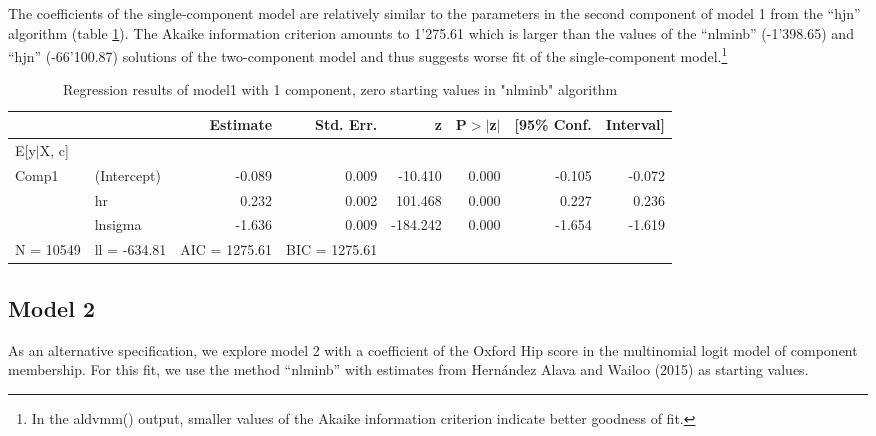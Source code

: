 \documentclass[
]{article}
\begin{document}
The coefficients of the single-component model are relatively similar to the parameters in the second component of model 1 from the ``hjn'' algorithm (table \ref{tab:tab-sum-tobit}). The Akaike information criterion amounts to 1'275.61 which is larger than the values of the ``nlminb'' (-1'398.65) and ``hjn'' (-66'100.87) solutions of the two-component model and thus suggests worse fit of the single-component model.\footnote{In the aldvmm() output, smaller values of the Akaike information criterion indicate better goodness of fit.}

\begin{table}[ht]
\centering
\caption{Regression results of model1 with 1 component, 
                     zero starting values in "nlminb" algorithm} 
\label{tab:tab-sum-tobit}
\begin{tabular}{llrrrrrr}
  \hline
 &  & Estimate & Std. Err. & z & P$>$$|$z$|$ & [95\% Conf.  & Interval] \\ 
  \hline
E[y$|$X, c] &  &  &  &  &  &  &  \\ 
   \hline
Comp1 & (Intercept) & -0.089 & 0.009 & -10.410 & 0.000 & -0.105 & -0.072 \\ 
   & hr &  0.232 & 0.002 & 101.468 & 0.000 &  0.227 &  0.236 \\ 
   & lnsigma & -1.636 & 0.009 & -184.242 & 0.000 & -1.654 & -1.619 \\ 
   \hline
N = 10549 & ll = -634.81 & AIC = 1275.61 & BIC = 1275.61 &  &  &  &  \\ 
  \end{tabular}
\end{table}

\hypertarget{model-2}{%
\subsection{Model 2}\label{model-2}}

As an alternative specification, we explore model 2 with a coefficient of the Oxford Hip score in the multinomial logit model of component membership. For this fit, we use the method ``nlminb'' with estimates from Hernández Alava and Wailoo (2015) as starting values.
\end{document}
